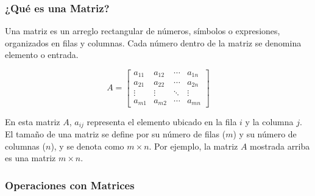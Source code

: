 \subsubsection{¿Qué es una Matriz?}

Una matriz es un arreglo rectangular de números, símbolos o expresiones, organizados en filas y columnas.  Cada número dentro de la matriz se denomina elemento o entrada.  

\begin{equation*}
	A = \begin{bmatrix}
		a_{11} & a_{12} & \cdots & a_{1n} \\
		a_{21} & a_{22} & \cdots & a_{2n} \\
		\vdots & \vdots & \ddots & \vdots \\
		a_{m1} & a_{m2} & \cdots & a_{mn} 
	\end{bmatrix}
\end{equation*}

En esta matriz $A$, $a_{ij}$ representa el elemento ubicado en la fila $i$ y la columna $j$.  El tamaño de una matriz se define por su número de filas ($m$) y su número de columnas ($n$), y se denota como $m \times n$.  Por ejemplo, la matriz $A$ mostrada arriba es una matriz $m \times n$.

\subsubsection{Operaciones con Matrices}

